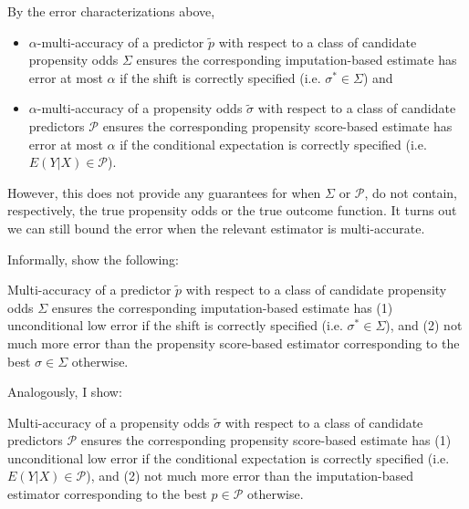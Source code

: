 \documentclass{article} %
\begin{document}
By the error characterizations above, 
\begin{itemize}
    \item $\alpha$-multi-accuracy of a predictor $\tilde{p}$ with respect to a class of candidate propensity odds $\Sigma$ ensures the corresponding imputation-based estimate has error at most $\alpha$ if the shift is correctly specified (i.e. $\sigma^* \in \Sigma$) and 
    \item $\alpha$-multi-accuracy of a propensity odds $\tilde{\sigma}$ with respect to a class of candidate predictors $\mathcal{P}$ ensures the corresponding propensity score-based estimate has error at most $\alpha$ if the conditional expectation is correctly specified (i.e. $E(Y|X) \in \mathcal{P}$).
\end{itemize}

However, this does not provide any guarantees for when $\Sigma$ or $\mathcal{P}$, do not contain, respectively, the true propensity odds or the true outcome function. It turns out we can still bound the error when the relevant estimator is multi-accurate. 

Informally, \cite{kim2022universal} show the following:

Multi-accuracy of a predictor $\tilde{p}$ with respect to a class of candidate propensity odds $\Sigma$ ensures the corresponding imputation-based estimate has (1) unconditional low error if the shift is correctly specified (i.e. $\sigma^* \in \Sigma$), and (2) not much more error than the propensity score-based estimator corresponding to the best $\sigma \in \Sigma$ otherwise.

Analogously, I show:

Multi-accuracy of a propensity odds $\tilde{\sigma}$ with respect to a class of candidate predictors $\mathcal{P}$ ensures the corresponding propensity score-based estimate has (1) unconditional low error if the conditional expectation is correctly specified (i.e. $E(Y|X) \in \mathcal{P}$), and (2) not much more error than the imputation-based estimator corresponding to the best $p \in \mathcal{P}$ otherwise.
\end{document}

